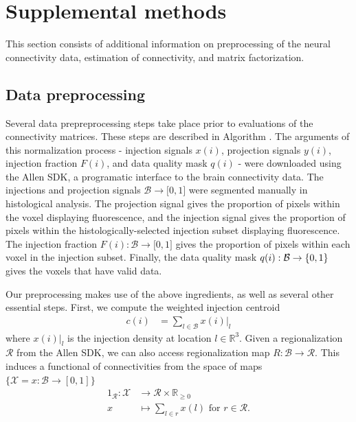 \newpage 
\section{Supplemental methods}
\label{supp_sec:methods}

This section consists of additional information on preprocessing of the neural connectivity data, estimation of connectivity, and matrix factorization.

\subsection{Data preprocessing}
\label{supp_sec:dp}

Several data prepreprocessing steps take place prior to evaluations of the connectivity matrices.
These steps are described in Algorithm \pre.
The arguments of this normalization process - injection signals $x(i)$, projection signals $y(i)$, injection fraction $F(i)$, and data quality mask $q(i)$ - were downloaded using the Allen SDK, a programatic interface to the brain connectivity data.
The injections and projection signals $ \mathcal B \to \mathbb [0,1]$ were segmented manually in histological analysis.
The projection signal gives the proportion of pixels within the voxel displaying fluorescence, and the injection signal gives the proportion of pixels within the histologically-selected injection subset displaying fluorescence.
The injection fraction $F(i): \mathcal B \to \mathbb [0,1]$ gives the proportion of pixels within each voxel in the injection subset.
Finally, the data quality mask $q(i): \mathcal B \to \mathbb \{0,1\}$ gives the voxels that have valid data.

Our preprocessing makes use of the above ingredients, as well as several other essential steps.
First, we compute the weighted injection centroid
\begin{eqnarray*}
c(i) &= \sum_{l \in \mathcal B} x (i) |_l 
\end{eqnarray*}
where $x(i) |_l$ is the injection density at location $l \in \mathbb R^3$.
Given a regionalization $\mathcal R$ from the Allen SDK, we can also access regionalization map $R: \mathcal B  \to \mathcal R $.
This induces a functional of connectivities from the space of maps $\{\mathcal X = x: \mathcal B \to [0,1]\}$
\begin{eqnarray*}
1_{\mathcal R}: \mathcal X &\to \mathcal R \times \mathbb R_{\geq 0} \\
x &\mapsto \sum_{l \in r}  x(l)  \text{ for } r \in \mathcal R.
\end{eqnarray*}

